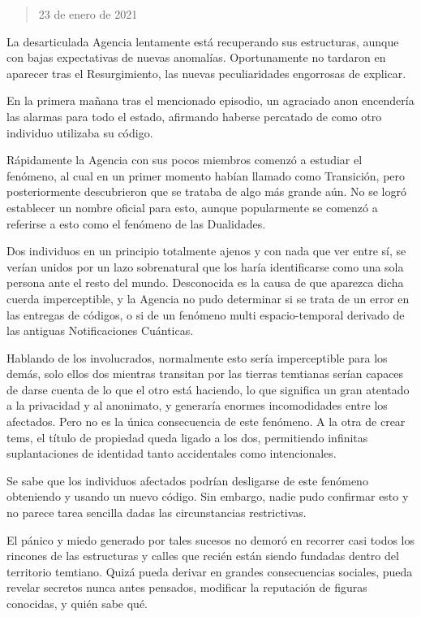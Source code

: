 \documentclass[
  spanish,
]{book}
\begin{document}
\begin{quote}
23 de enero de 2021
\end{quote}

La desarticulada Agencia lentamente está recuperando sus estructuras, aunque con bajas expectativas de nuevas anomalías. Oportunamente no tardaron en aparecer tras el Resurgimiento, las nuevas peculiaridades engorrosas de explicar.

En la primera mañana tras el mencionado episodio, un agraciado anon encendería las alarmas para todo el estado, afirmando haberse percatado de como otro individuo utilizaba su código.

Rápidamente la Agencia con sus pocos miembros comenzó a estudiar el fenómeno, al cual en un primer momento habían llamado como Transición, pero posteriormente descubrieron que se trataba de algo más grande aún. No se logró establecer un nombre oficial para esto, aunque popularmente se comenzó a referirse a esto como el fenómeno de las Dualidades.

Dos individuos en un principio totalmente ajenos y con nada que ver entre sí, se verían unidos por un lazo sobrenatural que los haría identificarse como una sola persona ante el resto del mundo. Desconocida es la causa de que aparezca dicha cuerda imperceptible, y la Agencia no pudo determinar si se trata de un error en las entregas de códigos, o si de un fenómeno multi espacio-temporal derivado de las antiguas Notificaciones Cuánticas.

Hablando de los involucrados, normalmente esto sería imperceptible para los demás, solo ellos dos mientras transitan por las tierras temtianas serían capaces de darse cuenta de lo que el otro está haciendo, lo que significa un gran atentado a la privacidad y al anonimato, y generaría enormes incomodidades entre los afectados. Pero no es la única consecuencia de este fenómeno. A la otra de crear tems, el título de propiedad queda ligado a los dos, permitiendo infinitas suplantaciones de identidad tanto accidentales como intencionales.

Se sabe que los individuos afectados podrían desligarse de este fenómeno obteniendo y usando un nuevo código. Sin embargo, nadie pudo confirmar esto y no parece tarea sencilla dadas las circunstancias restrictivas.

El pánico y miedo generado por tales sucesos no demoró en recorrer casi todos los rincones de las estructuras y calles que recién están siendo fundadas dentro del territorio temtiano. Quizá pueda derivar en grandes consecuencias sociales, pueda revelar secretos nunca antes pensados, modificar la reputación de figuras conocidas, y quién sabe qué.
\end{document}

